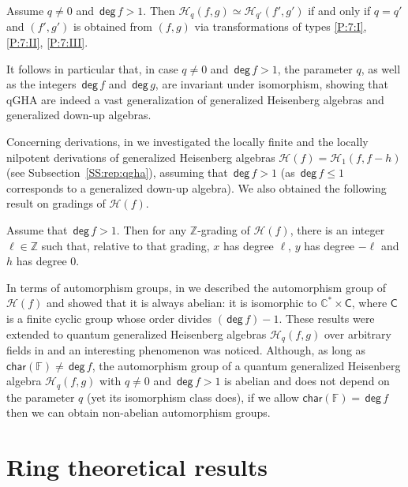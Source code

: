 \documentclass{commat}
\newcommand{\FF}{\mathbb{F}}
\newcommand{\ZZ}{\mathbb{Z}}
\newcommand{\CC}{\mathbb{C}}
\newcommand\chara{\mathsf {char}}
\newcommand{\hqfg}[1][f,g]{\mathcal{H}_q(#1)}
\newcommand{\hqqfg}[1][f',g']{\mathcal{H}_{q'}(#1)}
\newcommand{\hh}{\mathcal{H}}
\newcommand\degg{\, \mathsf{deg} \,}
\begin{document}
\begin{theorem}\label{T:iso}
	Assume $q\neq0$ and $\degg f>1$. Then $\hqfg\simeq \hqqfg$ if and only if $q=q'$ and $(f',g')$ is obtained from $(f,g)$ via transformations of types \ref{P:7:I}, \ref{P:7:II}, \ref{P:7:III}. 
\end{theorem}




It follows in particular that, in case $q\neq 0$ and $\degg f>1$, the parameter $q$, as well as the integers $\degg f$ and $\degg g$, are invariant under isomorphism, showing that qGHA are indeed a vast generalization of generalized Heisenberg algebras and generalized down-up algebras.


Concerning derivations, in \cite{sL17} we investigated the locally finite and the locally nilpotent derivations of generalized Heisenberg algebras $\hh(f)=\hh_1(f, f-h)$ (see Subsection~\ref{SS:rep:qgha}), assuming that $\degg f>1$ (as $\degg f\leq1$ corresponds to a generalized down-up algebra). We also obtained the following result on gradings of $\hh(f)$.

\begin{theorem}[{\cite[Cor.\ 4.2]{sL17}}]\label{T:lfd:zgrad}
	Assume that $\degg f>1$. Then for any $\ZZ$-grading of $\hh(f)$, there is an integer $\ell\in\ZZ$ such that, relative to that grading, $x$ has degree $\ell$, $y$ has degree $-\ell$ and $h$ has degree $0$.
\end{theorem}


In terms of automorphism groups, in \cite[Thm.\ 5.1]{sL17} we described the automorphism group of $\hh(f)$ and showed that it is always abelian: it is isomorphic to $\CC^*\times \mathsf{C}$, where $\mathsf{C}$ is a finite cyclic group whose order divides $(\degg f) -1$. These results were extended to quantum generalized Heisenberg algebras $\hqfg$ over arbitrary fields in \cite{LR22jaa} and an interesting phenomenon was noticed. Although, as long as $\chara(\FF)\neq\degg f$, the automorphism group of a quantum generalized Heisenberg algebra $\hqfg$ with $q\neq 0$ and $\degg f>1$ is abelian and does not depend on the parameter $q$ (yet its isomorphism class does), if we allow $\chara(\FF)=\degg f$ then we can obtain non-abelian automorphism groups.



\section{Ring theoretical results}\label{S:rt}
\end{document}
